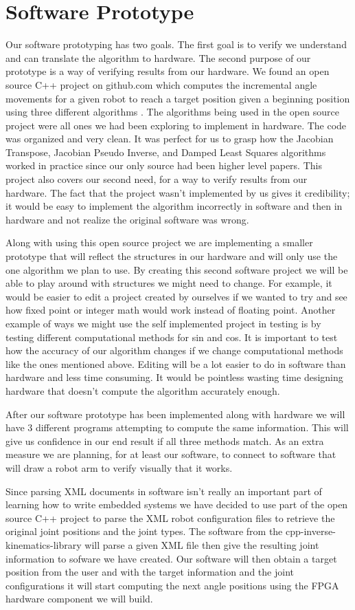 \section{Software Prototype}
Our software prototyping has two goals. The first goal is to verify we 
understand and can translate the algorithm to hardware. The second 
purpose of our prototype is a way of verifying results from our hardware.
We found an open source C++ project on github.com which computes the 
incremental angle movements for a given robot to reach a target position 
given a beginning position using three different algorithms 
\cite{ik_cpp_library}. The algorithms being used in the open source project 
were all ones we had been exploring to implement in hardware. The code was 
organized and very clean. It was perfect for us to grasp how the Jacobian 
Transpose, Jacobian Pseudo Inverse, and Damped Least Squares algorithms 
worked in practice since our only source had been higher level papers. This 
project also covers our second need, for a way to verify results from our 
hardware. The fact that the project wasn't implemented by us gives it 
credibility; it would be easy to implement the algorithm incorrectly in 
software and then in hardware and not realize the original software was 
wrong. 

Along with using this open source project we are implementing a smaller 
prototype that will reflect the structures in our hardware and will only 
use the one algorithm we plan to use. By creating this second software 
project we will be able to play around with structures we might need to 
change. For example, it would be easier to edit a project created by 
ourselves if we wanted to try and see how fixed point or integer math 
would work instead of floating point. Another example of ways we might use 
the self implemented project in testing is by testing different 
computational methods for sin and cos. It is important to test how the 
accuracy of our algorithm changes if we change computational methods like 
the ones mentioned above. Editing will be a lot easier to do in software 
than hardware and less time consuming. It would be pointless wasting time 
designing hardware that doesn't compute the algorithm accurately enough. 

After our software prototype has been implemented along with hardware 
we will have 3 different programs attempting to compute the same 
information. This will give us confidence in our end result if all three 
methods match. As an extra measure we are planning, for at least our 
software, to connect to software that will draw a robot arm to verify 
visually that it works. 

Since parsing XML documents in software isn't really an important part of 
learning how to write embedded systems we have decided to use part of the 
open source C++ project to parse the XML robot configuration files to 
retrieve the original joint positions and the joint types. The software 
from the cpp-inverse-kinematics-library will parse a given XML file then 
give the resulting joint information to sofware we have created. Our 
software will then obtain a target position from the user and with the 
target information and the joint configurations it will start computing the 
next angle positions using the FPGA hardware component we will build. 
